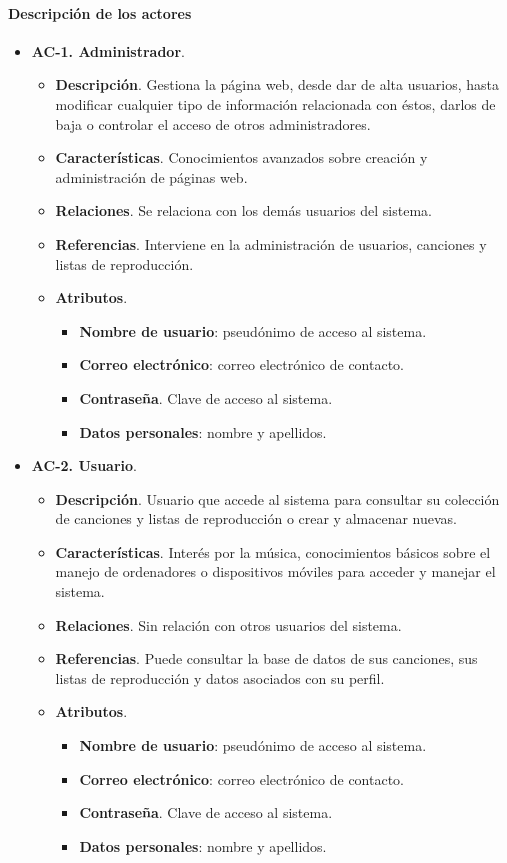 \paragraph{Descripción de los actores}

\begin{itemize}
	\item \textbf{AC-1. Administrador}.
	\begin{itemize}
		\item \textbf{Descripción}. Gestiona la página web, desde dar de alta usuarios, hasta modificar cualquier tipo de información relacionada con éstos, darlos de baja o controlar el acceso de otros administradores.
		\item \textbf{Características}. Conocimientos avanzados sobre creación y administración de páginas web.
		\item \textbf{Relaciones}. Se relaciona con los demás usuarios del sistema.
		\item \textbf{Referencias}. Interviene en la administración de usuarios, canciones y listas de reproducción.
		\item \textbf{Atributos}.
		\begin{itemize}
			\item \textbf{Nombre de usuario}: pseudónimo de acceso al sistema.
			\item \textbf{Correo electrónico}: correo electrónico de contacto.
			\item \textbf{Contraseña}. Clave de acceso al sistema.
			\item \textbf{Datos personales}: nombre y apellidos.
		\end{itemize}
	\end{itemize}
	
	\item \textbf{AC-2. Usuario}.
	\begin{itemize}
		\item \textbf{Descripción}. Usuario que accede al sistema para consultar su colección de canciones y listas de reproducción o crear y almacenar nuevas.
		\item \textbf{Características}. Interés por la música, conocimientos básicos sobre el manejo de ordenadores o dispositivos móviles para acceder y manejar el sistema.
		\item \textbf{Relaciones}. Sin relación con otros usuarios del sistema.
		\item \textbf{Referencias}. Puede consultar la base de datos de sus canciones, sus listas de reproducción y datos asociados con su perfil.
		\item \textbf{Atributos}.
		\begin{itemize}
			\item \textbf{Nombre de usuario}: pseudónimo de acceso al sistema.
			\item \textbf{Correo electrónico}: correo electrónico de contacto.
			\item \textbf{Contraseña}. Clave de acceso al sistema.
			\item \textbf{Datos personales}: nombre y apellidos.
		\end{itemize}
	\end{itemize}
\end{itemize}

